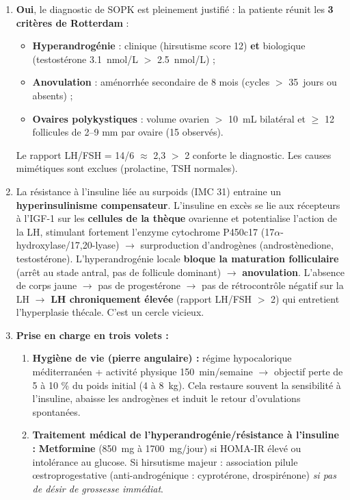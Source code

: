 \documentclass[11pt]{article}
\newcommand{\cle}[1]{{\popxbold\color{popdark}#1}}
\begin{document}
\begin{corrige}[Exercice]
\begin{enumerate}
\item \textbf{Oui}, le diagnostic de SOPK est pleinement justifié : la patiente réunit les \textbf{3 critères de Rotterdam} :
      \begin{itemize}
      \item \textbf{Hyperandrogénie} : clinique (hirsutisme score 12) \textbf{et} biologique (testostérone \SI{3,1}{nmol/L} $>$ \SI{2,5}{nmol/L}) ;
      \item \textbf{Anovulation} : aménorrhée secondaire de 8 mois (cycles $>$ \SI{35}{jours} ou absents) ;
      \item \textbf{Ovaires polykystiques} : volume ovarien $>$ \SI{10}{mL} bilatéral et $\ge$ 12 follicules de 2--9 mm par ovaire (15 observés).
      \end{itemize}
      Le rapport LH/FSH = 14/6 $\approx$ 2,3 $>$ 2 conforte le diagnostic. Les causes mimétiques sont exclues (prolactine, TSH normales).
\item La résistance à l'insuline liée au surpoids (IMC 31) entraine un \textbf{hyperinsulinisme compensateur}. L'insuline en excès se lie aux récepteurs à l'IGF-1 sur les \textbf{cellules de la thèque} ovarienne et potentialise l'action de la LH, stimulant fortement l'enzyme \cle{cytochrome P450c17} (17$\alpha$-hydroxylase/17,20-lyase) $\rightarrow$ surproduction d'androgènes (androstènedione, testostérone). L'hyperandrogénie locale \textbf{bloque la maturation folliculaire} (arrêt au stade antral, pas de follicule dominant) $\rightarrow$ \textbf{anovulation}. L'absence de corps jaune $\rightarrow$ pas de progestérone $\rightarrow$ pas de rétrocontrôle négatif sur la LH $\rightarrow$ \textbf{LH chroniquement élevée} (rapport LH/FSH $>$ 2) qui entretient l'hyperplasie thécale. C'est un cercle vicieux.
\item \textbf{Prise en charge en trois volets :}
      \begin{enumerate}
      \item \textbf{Hygiène de vie (pierre angulaire) :} régime hypocalorique méditerranéen + activité physique \SI{150}{min}/semaine $\rightarrow$ objectif perte de 5 à 10 \% du poids initial (\num{4} à \SI{8}{kg}). Cela restaure souvent la sensibilité à l'insuline, abaisse les androgènes et induit le retour d'ovulations spontanées.
      \item \textbf{Traitement médical de l'hyperandrogénie/résistance à l'insuline :} \textbf{Metformine} (\SI{850}{mg} à \SI{1700}{mg}/jour) si HOMA-IR élevé ou intolérance au glucose. Si hirsutisme majeur : association pilule œstroprogestative (anti-androgénique : cyprotérone, drospirénone) \emph{si pas de désir de grossesse immédiat}.

\end{enumerate}
\end{enumerate}
\end{corrige}
\end{document}
